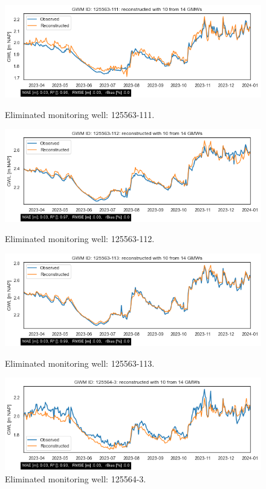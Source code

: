 \begin{figure}[h]
    \centering
    \begin{minipage}{0.48\linewidth}
        \includegraphics[width=\linewidth]{frontmatter/Heijplaat-fig/125563111.png}
        \caption{Eliminated monitoring well: 125563-111.}
        \label{hwell1}
    \end{minipage}
    \hfill
    \begin{minipage}{0.48\linewidth}
        \includegraphics[width=\linewidth]{frontmatter/Heijplaat-fig/125563112.png}
        \caption{Eliminated monitoring well: 125563-112.}
        \label{125563-112}
    \end{minipage}
    
    \begin{minipage}{0.48\linewidth}
        \includegraphics[width=\linewidth]{frontmatter/Heijplaat-fig/125563113.png}
        \caption{Eliminated monitoring well: 125563-113.}
        \label{125563-113}
    \end{minipage}
    \hfill
    \begin{minipage}{0.48\linewidth}
        \includegraphics[width=\linewidth]{frontmatter/Heijplaat-fig/125564-3.png}
        \caption{Eliminated monitoring well: 125564-3.}
        \label{hwell4}
    \end{minipage}
\end{figure}
